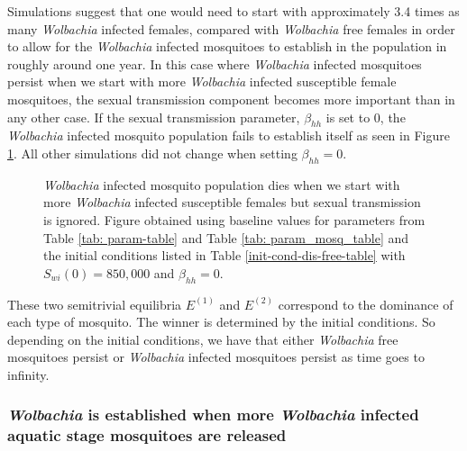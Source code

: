 \documentclass{ws-rv9x6}
\begin{document}
Simulations suggest that one would need to start with approximately 3.4 times as many \textit{Wolbachia} infected females, compared with \textit{Wolbachia} free females in order to allow for the \textit{Wolbachia} infected mosquitoes to establish in the population in roughly around one year. In this case where \textit{Wolbachia} infected mosquitoes persist when we start with more \textit{Wolbachia} infected susceptible female mosquitoes, the sexual transmission component becomes more important than in any other case. If the sexual transmission parameter, $\beta_{hh}$ is set to $0$, the \textit{Wolbachia} infected mosquito population fails to establish itself as seen in Figure \ref{domiWolbInfFemfails}. All other simulations did not change when setting $\beta_{hh}=0$.

\begin{figure}[H]
    \centering
    
    \caption{\textit{Wolbachia} infected mosquito population dies when we start with more \textit{Wolbachia} infected susceptible females but sexual transmission is ignored. Figure  obtained using baseline values for parameters from Table \ref{tab: param-table} and Table \ref{tab: param_mosq_table} and the initial conditions listed in Table \ref{init-cond-dis-free-table} with $S_{wi}(0)=850,000$ and $\beta_{hh}=0.$}
    \label{domiWolbInfFemfails}
\end{figure}



These two semitrivial equilibria $E^{(1)}$ and $E^{(2)}$ correspond to the dominance of each type of mosquito. The winner is determined by the initial conditions. So depending on the initial conditions, we have that either \textit{Wolbachia} free mosquitoes persist or \textit{Wolbachia} infected mosquitoes persist as time goes to infinity. 

\subsubsection{\textit{Wolbachia} is established when more \textit{Wolbachia} infected aquatic stage mosquitoes are released \label{moreaquatics}}
\end{document}
